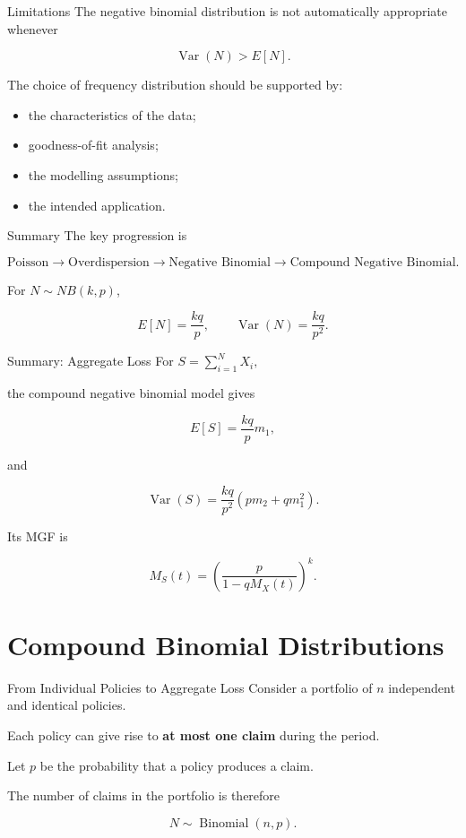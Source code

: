 \documentclass[
  ignorenonframetext,
  aspectratio=169,
]{beamer}
\providecommand{\tightlist}{%
  \setlength{\itemsep}{0pt}\setlength{\parskip}{0pt}}
\begin{document}
\begin{frame}{Limitations}
\protect{}\label{limitations}
The negative binomial distribution is not automatically appropriate
whenever

\[
\operatorname{Var}(N)>E[N].
\]

The choice of frequency distribution should be supported by:

\begin{itemize}
\tightlist
\item
  the characteristics of the data;
\item
  goodness-of-fit analysis;
\item
  the modelling assumptions;
\item
  the intended application.
\end{itemize}
\end{frame}

\begin{frame}{Summary}
\protect{}\label{summary}
The key progression is

\[
\text{Poisson}
\rightarrow
\text{Overdispersion}
\rightarrow
\text{Negative Binomial}
\rightarrow
\text{Compound Negative Binomial}.
\]

For \(N\sim NB(k,p)\),

\[
E[N]=\frac{kq}{p},
\qquad
\operatorname{Var}(N)=\frac{kq}{p^2}.
\]
\end{frame}

\begin{frame}{Summary: Aggregate Loss}
\protect{}\label{summary-aggregate-loss}
For \(S=\sum_{i=1}^{N}X_i,\)

the compound negative binomial model gives

\[
E[S]=\frac{kq}{p}m_1,
\]

and

\[
\operatorname{Var}(S)
=
\frac{kq}{p^2}
\left(pm_2+qm_1^2\right).
\]

Its MGF is

\[
M_S(t)
=
\left(
\frac{p}{1-qM_X(t)}
\right)^k.
\]
\end{frame}

\section{Compound Binomial Distributions}\label{compound-binomial}

\begin{frame}{From Individual Policies to Aggregate Loss}
\protect{}\label{from-individual-policies-to-aggregate-loss}
Consider a portfolio of \(n\) independent and identical policies.

Each policy can give rise to \textbf{at most one claim} during the
period.

Let \(p\) be the probability that a policy produces a claim.

The number of claims in the portfolio is therefore

\[
N \sim \operatorname{Binomial}(n,p).
\]
\end{frame}
\end{document}

